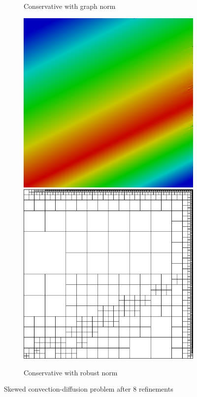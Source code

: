 \documentclass[letterpaper]{article}
\begin{document}
\begin{figure}
\begin{subfigure}[t]{0.45\textwidth}
\caption{Conservative with graph norm}
\label{fig:confusionGraph8c}
\end{subfigure}
\begin{subfigure}[t]{0.45\textwidth}
\centering
\includegraphics[width=\textwidth]{figs/Confusion/robust8c.png}
\includegraphics[width=\textwidth]{figs/Confusion/robust8c_mesh.png}
\caption{Conservative with robust norm}
\label{fig:confusionRobust8c}
\end{subfigure}
\caption{Skewed convection-diffusion problem after 8 refinements}
\end{figure}
\end{document}
